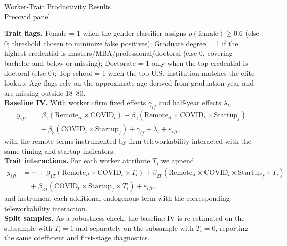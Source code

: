 \documentclass[11pt]{article}
\begin{document}
\begin{center}
{\LARGE Worker-Trait Productivity Results}\\[1ex]
{\large Precovid panel}
\end{center}

\noindent\textbf{Trait flags.}  Female = 1 when the gender classifier assigns $p(\text{female}) \ge 0.6$ (else 0; threshold chosen to minimize false positives); Graduate degree = 1 if the highest credential is masters/MBA/professional/doctoral (else 0, covering bachelor and below or missing); Doctorate = 1 only when the top credential is doctoral (else 0); Top school = 1 when the top U.S. institution matches the elite lookup; Age flags rely on the approximate age derived from graduation year and are missing outside 18--80.\\[0.6em]
\noindent\textbf{Baseline IV.}  With worker$\times$firm fixed effects $\gamma_{if}$ and half-year effects $\lambda_t$,
\begin{align*}
 y_{ift} &= \beta_1 (\text{Remote}_{it} \times \text{COVID}_t) + \beta_2 (\text{Remote}_{it} \times \text{COVID}_t \times \text{Startup}_f) \\
         &\quad + \beta_3 (\text{COVID}_t \times \text{Startup}_f) + \gamma_{if} + \lambda_t + \varepsilon_{ift},
\end{align*}
with the remote terms instrumented by firm teleworkability interacted with the same timing and startup indicators.\\[0.6em]
\noindent\textbf{Trait interactions.}  For each worker attribute $T_i$ we append
\begin{align*}
 y_{ift} &= \cdots + \beta_{1T} (\text{Remote}_{it} \times \text{COVID}_t \times T_i) + \beta_{2T} (\text{Remote}_{it} \times \text{COVID}_t \times \text{Startup}_f \times T_i) \\
         &\quad + \beta_{3T} (\text{COVID}_t \times \text{Startup}_f \times T_i) + \varepsilon_{ift},
\end{align*}
and instrument each additional endogenous term with the corresponding teleworkability interaction.\\[0.6em]
\noindent\textbf{Split samples.}  As a robustness check, the baseline IV is re-estimated on the subsample with $T_i=1$ and separately on the subsample with $T_i=0$, reporting the same coefficient and first-stage diagnostics.\\[1em]
\end{document}
